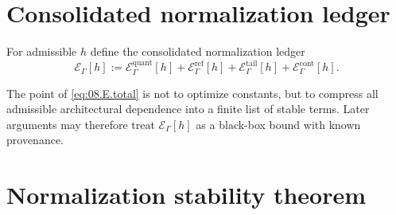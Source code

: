 \section{Consolidated normalization ledger}\label{sec:08.consolidated-ledger}

\begin{definition}\label{def:08.total-ledger}
For admissible $h$ define the consolidated normalization ledger
\begin{equation}\label{eq:08.E.total}
\mathcal E_\Gamma[h]
:=\mathcal E^{\mathrm{quant}}_\Gamma[h]
+\mathcal E^{\mathrm{ref}}_\Gamma[h]
+\mathcal E^{\mathrm{tail}}_\Gamma[h]
+\mathcal E^{\mathrm{cont}}_\Gamma[h].
\end{equation}
\end{definition}

\begin{remark}\label{rem:08.ledger.portable}
The point of \eqref{eq:08.E.total} is not to optimize constants, but to compress all admissible architectural dependence into a
finite list of stable terms. Later arguments may therefore treat $\mathcal E_\Gamma[h]$ as a black-box bound with known provenance.
\end{remark}

\section{Normalization stability theorem}\label{sec:08.norm-stability}

